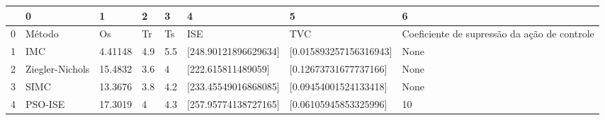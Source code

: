 \begin{tabular}{llllllll}
\toprule
{} &                0 &        1 &    2 &    3 &                     4 &                       5 &                                             6 \\
\midrule
0 &           Método &       Os &   Tr &   Ts &                   ISE &                     TVC &  Coeficiente de supressão da ação de controle \\
1 &              IMC &  4.41148 &  4.9 &  5.5 &  [248.90121896629634] &  [0.015893257156316943] &                                          None \\
2 &  Ziegler-Nichols &  15.4832 &  3.6 &    4 &    [222.615811489059] &   [0.12673731677737166] &                                          None \\
3 &             SIMC &  13.3676 &  3.8 &  4.2 &  [233.45549016868085] &   [0.09454001524133418] &                                          None \\
4 &          PSO-ISE &  17.3019 &    4 &  4.3 &  [257.95774138727165] &   [0.06105945853325996] &                                            10 \\
\bottomrule
\end{tabular}
